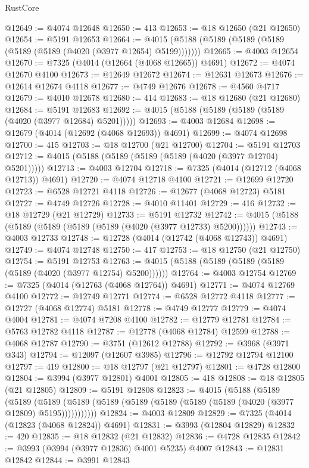 \begin{lexlean}{RustCore}
\begin{coremodule}
@12649 := @4074 @12648
@12650 := 413
@12653 := @18 @12650 (@21 @12650)
@12654 := @5191 @12653
@12664 := @4015 (@5188 (@5189 (@5189 (@5189 (@5189 (@5189 (@4020 (@3977 @12654) @5199)))))))
@12665 := @4003 @12654
@12670 := @7325 (@4014 (@12664 (@4068 @12665)) @4691)
@12672 := @4074 @12670 @4100
@12673 := @12649 @12672
@12674 := @12631 @12673
@12676 := @12614 @12674 @4118
@12677 := @4749 @12676
@12678 := @4560 @4717
@12679 := @4010 @12678
@12680 := 414
@12683 := @18 @12680 (@21 @12680)
@12684 := @5191 @12683
@12692 := @4015 (@5188 (@5189 (@5189 (@5189 (@4020 (@3977 @12684) @5201)))))
@12693 := @4003 @12684
@12698 := @12679 (@4014 (@12692 (@4068 @12693)) @4691)
@12699 := @4074 @12698
@12700 := 415
@12703 := @18 @12700 (@21 @12700)
@12704 := @5191 @12703
@12712 := @4015 (@5188 (@5189 (@5189 (@5189 (@4020 (@3977 @12704) @5201)))))
@12713 := @4003 @12704
@12718 := @7325 (@4014 (@12712 (@4068 @12713)) @4691)
@12720 := @4074 @12718 @4100
@12721 := @12699 @12720
@12723 := @6528 @12721 @4118
@12726 := @12677 (@4068 @12723) @5181
@12727 := @4749 @12726
@12728 := @4010 @11401
@12729 := 416
@12732 := @18 @12729 (@21 @12729)
@12733 := @5191 @12732
@12742 := @4015 (@5188 (@5189 (@5189 (@5189 (@5189 (@4020 (@3977 @12733) @5200))))))
@12743 := @4003 @12733
@12748 := @12728 (@4014 (@12742 (@4068 @12743)) @4691)
@12749 := @4074 @12748
@12750 := 417
@12753 := @18 @12750 (@21 @12750)
@12754 := @5191 @12753
@12763 := @4015 (@5188 (@5189 (@5189 (@5189 (@5189 (@4020 (@3977 @12754) @5200))))))
@12764 := @4003 @12754
@12769 := @7325 (@4014 (@12763 (@4068 @12764)) @4691)
@12771 := @4074 @12769 @4100
@12772 := @12749 @12771
@12774 := @6528 @12772 @4118
@12777 := @12727 (@4068 @12774) @5181
@12778 := @4749 @12777
@12779 := @4074 @4004
@12781 := @4074 @7208 @4100
@12782 := @12779 @12781
@12784 := @5763 @12782 @4118
@12787 := @12778 (@4068 @12784) @12599
@12788 := @4068 @12787
@12790 := @3751 (@12612 @12788)
@12792 := @3968 (@3971 @343)
@12794 := @12097 (@12607 @3985)
@12796 := @12792 @12794 @12100
@12797 := 419
@12800 := @18 @12797 (@21 @12797)
@12801 := @4728 @12800
@12804 := @3994 (@3977 @12801) @4001
@12805 := 418
@12808 := @18 @12805 (@21 @12805)
@12809 := @5191 @12808
@12823 := @4015
    (@5188
      (@5189
        (@5189
          (@5189 (@5189 (@5189 (@5189 (@5189 (@5189 (@5189 (@4020 (@3977 @12809) @5195)))))))))))
@12824 := @4003 @12809
@12829 := @7325 (@4014 (@12823 (@4068 @12824)) @4691)
@12831 := @3993 (@12804 @12829)
@12832 := 420
@12835 := @18 @12832 (@21 @12832)
@12836 := @4728 @12835
@12842 := @3993 (@3994 (@3977 @12836) @4001 @5235) @4007
@12843 := @12831 @12842
@12844 := @3991 @12843

\end{coremodule}
\end{lexlean}
